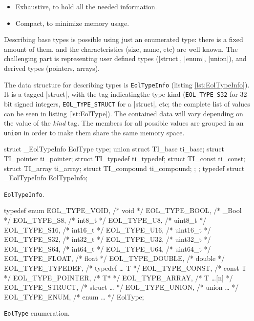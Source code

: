 \begin{itemize}
  \item Exhaustive, to hold all the needed information.
  \item Compact, to minimize memory usage.
\end{itemize}

Describing base types is possible using just an enumerated type: there is
a fixed amount of them, and the characteristics (size, name, etc) are well
known. The challenging part is representing user defined types (\Mc|struct|,
\Mc|enum|, \Mc|union|), and derived types (pointers, arrays).

The data structure for describing types is \verb|EolTypeInfo| (listing
\vref{lst:EolTypeInfo}). It is a tagged \Mc|struct|, with the tag
indicatingthe type kind (\verb|EOL_TYPE_S32| for 32-bit signed integers,
\verb|EOL_TYPE_STRUCT| for a \Mc|struct|, etc; the complete list of values
can be seen in listing \vref{lst:EolType}). The contained data will vary
depending on the value of the \emph{kind} tag. The members for all possible
values are grouped in an \texttt{union} in order to make them share the
same memory space.

\begin{listing}[H]
  \begin{ccode}
    struct _EolTypeInfo {
      EolType type;
      union {
        struct TI_base     ti_base;
        struct TI_pointer  ti_pointer;
        struct TI_typedef  ti_typedef;
        struct TI_const    ti_const;
        struct TI_array    ti_array;
        struct TI_compound ti_compound;
      };
    };
    typedef struct _EolTypeInfo EolTypeInfo;
  \end{ccode}
  \caption{\texttt{EolTypeInfo}.}
  \label{lst:EolTypeInfo}
\end{listing}

\begin{listing}[f]
  \centering
  \begin{ccode}
    typedef enum {
      EOL_TYPE_VOID,    /* void        */
      EOL_TYPE_BOOL,    /* _Bool       */
      EOL_TYPE_S8,      /* int8_t      */
      EOL_TYPE_U8,      /* uint8_t     */
      EOL_TYPE_S16,     /* int16_t     */
      EOL_TYPE_U16,     /* uint16_t    */
      EOL_TYPE_S32,     /* int32_t     */
      EOL_TYPE_U32,     /* uint32_t    */
      EOL_TYPE_S64,     /* int64_t     */
      EOL_TYPE_U64,     /* uint64_t    */
      EOL_TYPE_FLOAT,   /* float       */
      EOL_TYPE_DOUBLE,  /* double      */
      EOL_TYPE_TYPEDEF, /* typedef … T */
      EOL_TYPE_CONST,   /* const T     */
      EOL_TYPE_POINTER, /* T*          */
      EOL_TYPE_ARRAY,   /* T …[n]      */
      EOL_TYPE_STRUCT,  /* struct …    */
      EOL_TYPE_UNION,   /* union …     */
      EOL_TYPE_ENUM,    /* enum …      */
    } EolType;
  \end{ccode}
  \caption{\texttt{EolType} enumeration.}
  \label{lst:EolType}
\end{listing}


